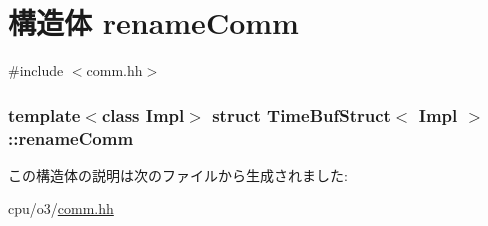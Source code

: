 \hypertarget{structTimeBufStruct_1_1renameComm}{
\section{構造体 renameComm}
\label{structTimeBufStruct_1_1renameComm}
}


{\ttfamily \#include $<$comm.hh$>$}\subsubsection*{template$<$class Impl$>$ struct TimeBufStruct$<$ Impl $>$::renameComm}



この構造体の説明は次のファイルから生成されました:\begin{DoxyCompactItemize}
\item 
cpu/o3/\hyperlink{o3_2comm_8hh}{comm.hh}\end{DoxyCompactItemize}
